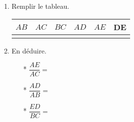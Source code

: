 \documentclass[11pt]{article}
\begin{document}
\begin{enumerate}

\item Remplir le tableau.
  \begin{center}
    \begin{tabular}{| c | c | c | c | c | c |}
      \hline
      $AB$    & $AC$ & $BC$ & $AD$ & $AE$  & DE \\
      \hline
      \phantom{1234567890} & \phantom{1234567890} & \phantom{1234567890} & \phantom{1234567890} & \phantom{1234567890} &  \phantom{1234567890} \\
      \hline
    \end{tabular}
  \end{center}

\item En déduire.
  \begin{multicols}{3}
    \begin{itemize}
    \item[*] $\dfrac{AE}{AC} = $
    \item[*] $\dfrac{AD}{AB} = $
    \item[*] $\dfrac{ED}{BC} = $
    \end{itemize}
  \end{multicols}
\end{enumerate}
\end{document}
